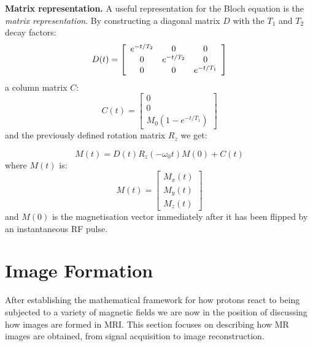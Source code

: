 \hfill

\textbf{Matrix representation.} A useful representation for the Bloch equation is the \textit{matrix representation}.
By constructing a diagonal matrix $D$ with the $T_1$ and $T_2$ decay factors:
\begin{equation}
    D ( t ) = \left[
    \begin{array}{c c c}
          e^{-t/T_2} &     0      &     0 \\
              0      & e^{-t/T_2} &     0 \\
              0      &     0      & e^{-t/T_1}
    \end{array}
    \right]
\end{equation}
a column matrix $C$:
\begin{equation}
    C ( t ) = \left[
    \begin{array}{c}
        0 \\
        0 \\
    M_0(1 - e^{-t/T_1})
    \end{array}
    \right]
\end{equation}
and the previously defined rotation matrix $R_z$ we get:

\begin{equation} \label{eq:444}
    M(t) = D(t) R_z(-\omega_0 t) M(0) + C(t)
\end{equation}
where $M(t)$ is:
\begin{equation}
    M ( t ) = \left[
    \begin{array}{c}
        M_x(t) \\
        M_y(t) \\
        M_z(t)
    \end{array}
    \right]
\end{equation}
and $M(0)$ is the magnetisation vector immediately after it has been flipped by an instantaneous RF pulse.

\section{Image Formation}\label{chapterlabel2sec12}
After establishing the mathematical framework for how protons react to being subjected to a variety of magnetic fields we are now in the position of discussing how images are formed in MRI.
This section focuses on describing how MR images are obtained, from signal acquisition to image reconstruction. 

\hfill

